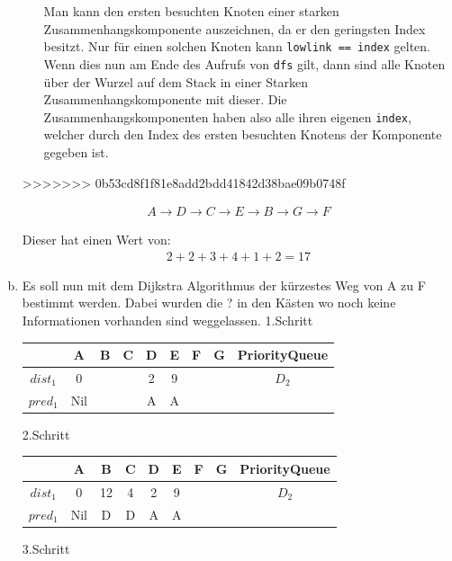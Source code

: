 \documentclass[11pt]{article}
\begin{document}
\begin{enumerate}[a)]
\begin{enumerate}[a)]
        Man kann den ersten besuchten Knoten einer starken
        Zusammenhangskomponente auszeichnen, da er den geringsten Index
        besitzt. Nur f\"ur einen solchen Knoten kann \texttt{lowlink  == index}
        gelten. Wenn dies nun am Ende des Aufrufs von \texttt{dfs} gilt, dann
        sind alle Knoten \"uber der Wurzel auf dem Stack in einer Starken
        Zusammenhangskomponente mit dieser. Die Zusammenhangskomponenten haben
        also alle ihren eigenen \texttt{index}, welcher durch den Index des
        ersten besuchten Knotens der Komponente gegeben ist.







\end{enumerate} 

>>>>>>> 0b53cd8f1f81e8add2bdd41842d38bae09b0748f

\begin{align*}
A \rightarrow D \rightarrow C \rightarrow E \rightarrow B \rightarrow G \rightarrow F
\end{align*}


Dieser hat einen Wert von:
\begin{align*}
2 + 2 + 3 + 4 + 1 + 2 = 17
\end{align*} 
\item
Es soll nun mit dem Dijkstra Algorithmus der kürzestes Weg von A zu F bestimmt
werden. Dabei wurden die ? in den Kästen wo noch keine Informationen vorhanden
sind weggelassen.
1.Schritt

\begin{tabular}{|c|c|c|c|c|c|c|c|c|}
	\hline  		  & A & B & C & D & E & F & G & PriorityQueue\\ 
	\hline $dist_{1}$ & 0 &   &  & 2 & 9 &	&  & $D_{2}$\\ 
	\hline $pred_{1}$ & Nil &  &  & A & A &	&  &\\
	\hline 
\end{tabular} 

2.Schritt

\begin{tabular}{|c|c|c|c|c|c|c|c|c|}
	\hline  		  & A & B & C & D & E & F & G & PriorityQueue\\ 
	\hline $dist_{1}$ & 0 & 12  & 4 & 2 & 9 &  &  & $D_{2}$\\ 
	\hline $pred_{1}$ & Nil & D & D & A & A &  &  &\\
	\hline 
\end{tabular} 

3.Schritt


\end{enumerate}
\end{document}
